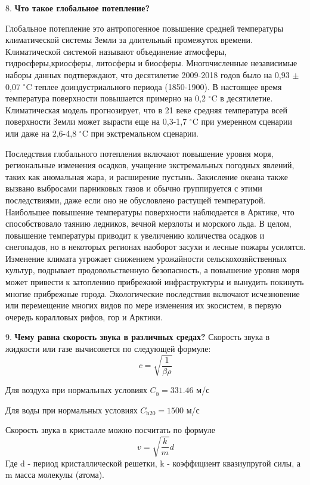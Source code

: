 \documentclass{article}
\begin{document}
 {


8. \textbf{Что такое глобальное потепление?}

Глобальное потепление это антропогенное повышение средней температуры климатической системы Земли за длительный промежуток времени. Климатической системой называют объединение атмосферы, гидросферы,криосферы, литосферы и биосферы. Многочисленные независимые наборы данных подтверждают, что десятилетие 2009-2018 годов было на 0,93 $\pm$ 0,07 $^\circ$C теплее доиндустриального периода (1850-1900). В настоящее время температура поверхности повышается примерно на 0,2 $^\circ$C в десятилетие. Климатическая модель прогнозирует, что в 21 веке средняя температура всей поверхности Земли может вырасти еще на 0,3-1,7  $^\circ$C при умеренном сценарии или даже на 2,6-4,8  $^\circ$C при экстремальном сценарии.

Последствия глобального потепления включают повышение уровня моря, региональные изменения осадков, учащение экстремальных погодных явлений, таких как аномальная жара, и расширение пустынь. Закисление океана также вызвано выбросами парниковых газов и обычно группируется с этими последствиями, даже если оно не обусловлено растущей температурой. Наибольшее повышение температуры поверхности наблюдается в Арктике, что способствовало таянию ледников, вечной мерзлоты и морского льда. В целом, повышение температуры приводит к увеличению количества осадков и снегопадов, но в некоторых регионах наоборот засухи и лесные пожары усилятся. Изменение климата угрожает снижением урожайности сельскохозяйственных культур, подрывает продовольственную безопасность, а повышение уровня моря может привести к затоплению прибрежной инфраструктуры и вынудить покинуть многие прибрежные города. Экологические последствия включают исчезновение или перемещение многих видов по мере изменения их экосистем, в первую очередь коралловых рифов, гор и Арктики.

9. \textbf{Чему равна скорость звука в различных средах?}
Скорость звука в жидкости или газе вычисояется по следующей формуле:
$$c = \sqrt{\frac{1}{\beta \rho}}$$

Для воздуха при нормальных условиях
$C_{\text{в}} = 331.46$ м/с

Для воды при нормальных условиях
$C_{\text{h20}} = 1500$ м/с

Скорость звука в кристалле можно посчитать по формуле 
$$v=\sqrt{\frac{k}{m}}d$$
Где d - период кристаллической решетки, k - коэффициент квазиупругой силы, а m масса молекулы (атома).

}
\end{document}
